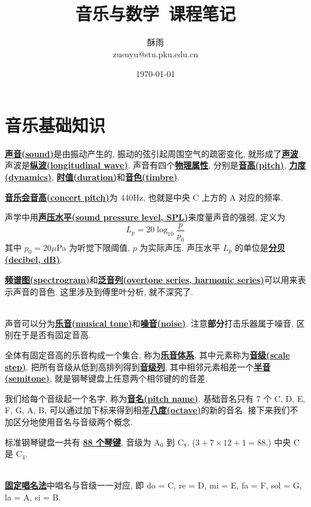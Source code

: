 \documentclass[8pt]{article}
\title{\heiti\zihao{1} 音乐与数学\ 课程笔记}
\author{\kaishu\zihao{-3} 酥雨\\zusuyu@stu.pku.edu.cn}
\date{\today}
\theoremstyle{compact}
\def\obj#1{\textbf{\uline{#1}}}
\def\A{\textrm{A}}
\def\C{\textrm{C}}
\begin{document}
\pagestyle{plain}

\maketitle
\tableofcontents
\newpage

\section{音乐基础知识}
\obj{声音(sound)}是由振动产生的, 振动的弦引起周围空气的疏密变化, 就形成了\obj{声波}. 声波是\obj{纵波(longitudinal wave)}. 声音有四个\obj{物理属性}, 分别是\obj{音高(pitch)}, \obj{力度(dynamics)}, \obj{时值(duration)}和\obj{音色(timbre)}.

\obj{音乐会音高(concert pitch)}为 440Hz, 也就是中央 C 上方的 A 对应的频率.

声学中用\obj{声压水平(sound pressure level, SPL)}来度量声音的强弱, 定义为 $$L_p = 20\log_{10}\frac{p}{p_0}$$ 其中 $p_0 = 20\mu$Pa 为听觉下限阈值, $p$ 为实际声压. 声压水平 $L_p$ 的单位是\obj{分贝(decibel, dB)}.

\obj{频谱图(spectrogram)}和\obj{泛音列(overtone series, harmonic series)}可以用来表示声音的音色. 这里涉及到傅里叶分析, 就不深究了.

~\\

声音可以分为\obj{乐音(musical tone)}和\obj{噪音(noise)}. 注意\textbf{部分}打击乐器属于噪音, 区别在于是否有固定音高.

全体有固定音高的乐音构成一个集合, 称为\obj{乐音体系}, 其中元素称为\obj{音级(scale step)}. 把所有音级从低到高排列得到\obj{音级列}, 其中相邻元素相差一个\obj{半音(semitone)}, 就是钢琴键盘上任意两个相邻键的的音差.

我们给每个音级起一个名字, 称为\obj{音名(pitch name)}. 基础音名只有 7 个 C, D, E, F, G, A, B, 可以通过加下标来得到相差\obj{八度(octave)}的新的音名. 接下来我们不加区分地使用音名与音级两个概念.

标准钢琴键盘一共有 \obj{88 个琴键}, 音级为 $\A_0$ 到 $\C_8$. ($3 + 7 \times 12 + 1 = 88$.) 中央 C 是 $\C_4$.

~\\
\obj{固定唱名法}中唱名与音级一一对应, 即 do = C, re = D, mi = E, fa = F, sol = G, la = A, si = B.
\end{document}
